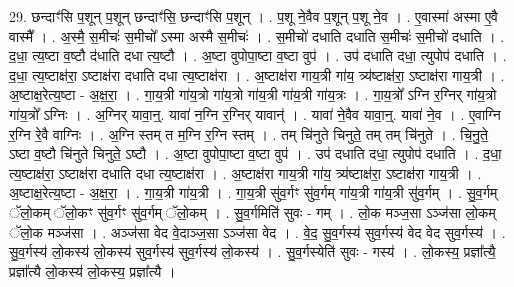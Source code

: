 \documentclass[17pt]{extarticle}
\begin{document}
29. छन्दाꣳ॑सि प॒शून् प॒शून् छन्दाꣳ॑सि॒ छन्दाꣳ॑सि प॒शून् । . प॒शू ने॒वैव प॒शून् प॒शू ने॒व । . ए॒वास्मा॑ अस्मा ए॒वै वास्मै᳚ । . अ॒स्मै॒ स॒मीचः॑ स॒मीचो᳚ ऽस्मा अस्मै स॒मीचः॑ । . स॒मीचो॑ दधाति दधाति स॒मीचः॑ स॒मीचो॑ दधाति । . द॒धा॒ त्य॒ष्टा व॒ष्टौ द॑धाति दधा त्य॒ष्टौ । . अ॒ष्टा वुपोपा॒ष्टा व॒ष्टा वुप॑ । . उप॑ दधाति दधा॒ त्युपोप॑ दधाति । . द॒धा॒ त्य॒ष्टाक्ष॑रा॒ ऽष्टाक्ष॑रा दधाति दधा त्य॒ष्टाक्ष॑रा । . अ॒ष्टाक्ष॑रा गाय॒त्री गा॑य॒ त्र्य॑ष्टाक्ष॑रा॒ ऽष्टाक्ष॑रा गाय॒त्री । . अ॒ष्टाक्ष॒रेत्य॒ष्टा - अ॒क्ष॒रा॒ । . गा॒य॒त्री गा॑य॒त्रो गा॑य॒त्रो गा॑य॒त्री गा॑य॒त्री गा॑य॒त्रः । . गा॒य॒त्रो᳚ ऽग्नि र॒ग्निर् गा॑य॒त्रो गा॑य॒त्रो᳚ ऽग्निः । . अ॒ग्निर् यावा॒न्॒. यावा॑ न॒ग्नि र॒ग्निर् यावान्॑ । . यावा॑ ने॒वैव यावा॒न्॒. यावा॑ ने॒व । . ए॒वाग्नि र॒ग्नि रे॒वै वाग्निः । . अ॒ग्नि स्तम् त म॒ग्नि र॒ग्नि स्तम् । . तम् चि॑नुते चिनुते॒ तम् तम् चि॑नुते । . चि॒नु॒ते॒ ऽष्टा व॒ष्टौ चि॑नुते चिनुते॒ ऽष्टौ । . अ॒ष्टा वुपोपा॒ष्टा व॒ष्टा वुप॑ । . उप॑ दधाति दधा॒ त्युपोप॑ दधाति । . द॒धा॒ त्य॒ष्टाक्ष॑रा॒ ऽष्टाक्ष॑रा दधाति दधा त्य॒ष्टाक्ष॑रा । . अ॒ष्टाक्ष॑रा गाय॒त्री गा॑य॒ त्र्य॑ष्टाक्ष॑रा॒ ऽष्टाक्ष॑रा गाय॒त्री । . अ॒ष्टाक्ष॒रेत्य॒ष्टा - अ॒क्ष॒रा॒ । . गा॒य॒त्री गा॑य॒त्री । . गा॒य॒त्री सु॑व॒र्गꣳ सु॑व॒र्गम् गा॑य॒त्री गा॑य॒त्री सु॑व॒र्गम् । . सु॒व॒र्गम् ॅलो॒कम् ॅलो॒कꣳ सु॑व॒र्गꣳ सु॑व॒र्गम् ॅलो॒कम् । . सु॒व॒र्गमिति॑ सुवः - गम् । . लो॒क मञ्ज॒सा ऽञ्ज॑सा लो॒कम् ॅलो॒क मञ्ज॑सा । . अञ्ज॑सा वेद वे॒दाञ्ज॒सा ऽञ्ज॑सा वेद । . वे॒द॒ सु॒व॒र्गस्य॑ सुव॒र्गस्य॑ वेद वेद सुव॒र्गस्य॑ । . सु॒व॒र्गस्य॑ लो॒कस्य॑ लो॒कस्य॑ सुव॒र्गस्य॑ सुव॒र्गस्य॑ लो॒कस्य॑ । . सु॒व॒र्गस्येति॑ सुवः - गस्य॑ । . लो॒कस्य॒ प्रज्ञा᳚त्यै॒ प्रज्ञा᳚त्यै लो॒कस्य॑ लो॒कस्य॒ प्रज्ञा᳚त्यै । \newline
\end{document}
